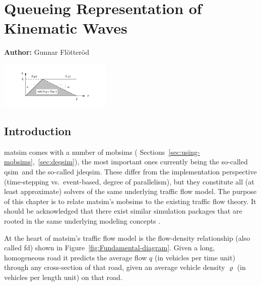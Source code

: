 \chapter{Queueing Representation of Kinematic Waves}
\label{ch:kinematicwaves}

\hfill \textbf{Author:} Gunnar Flötteröd

\begin{center} \includegraphics[width=0.4\textwidth, angle=0]{understanding/figures/waves/fig0.pdf} \end{center}


\newcommand{\SINGLEQUEUESIM}{\gls{qsim}}
\newcommand{\DOUBLEQUEUESIM}{\gls{jdeqsim}}

\section{\label{sec:Introduction}Introduction}

\gls{matsim} comes with a number of \glspl{mobsim} (\cf
Sections~\ref{sec:using-mobsims},~\ref{sec:deqsim}), the most important ones
currently being the so-called \SINGLEQUEUESIM\ and the so-called
\DOUBLEQUEUESIM. These differ from the implementation perspective
(time-stepping vs.\ event-based, degree of parallelism), but they constitute
all (at least approximate) solvers of the same underlying traffic flow model.
The purpose of this chapter is to relate \gls{matsim}'s \glspl{mobsim} 
to the existing traffic flow theory. It should be acknowledged that there exist
similar simulation packages that are rooted in the same underlying modeling concepts 
\citep[][]{mahut-2007,zhou-2014}.

At the heart of \gls{matsim}'s traffic flow model is the flow-density relationship
(also called \gls{fd}) shown in Figure~\ref{fig:Fundamental-diagram}.
Given a long, homogeneous
road it predicts the average flow $q$ (in vehicles per time unit)
through any cross-section of that road, given an average vehicle density
$\varrho$ (in vehicles per length unit) on that road. 

